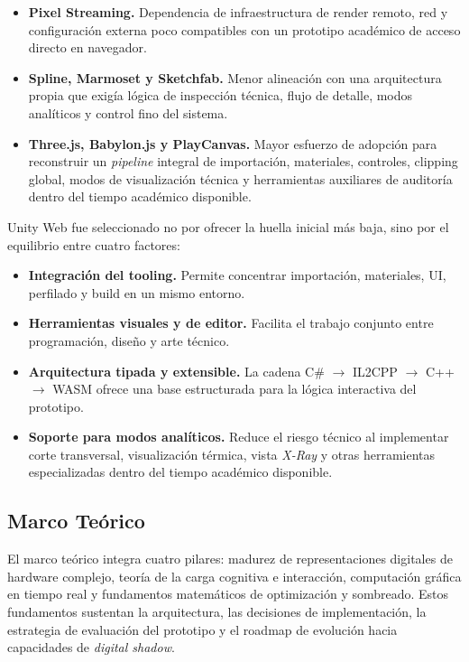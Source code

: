 \begin{itemize}
    \item \textbf{Pixel Streaming.} Dependencia de infraestructura de render remoto, red y configuración externa poco compatibles con un prototipo académico de acceso directo en navegador.
    \item \textbf{Spline, Marmoset y Sketchfab.} Menor alineación con una arquitectura propia que exigía lógica de inspección técnica, flujo de detalle, modos analíticos y control fino del sistema.
    \item \textbf{Three.js, Babylon.js y PlayCanvas.} Mayor esfuerzo de adopción para reconstruir un \textit{pipeline} integral de importación, materiales, controles, clipping global, modos de visualización técnica y herramientas auxiliares de auditoría dentro del tiempo académico disponible.
\end{itemize}

Unity Web fue seleccionado no por ofrecer la huella inicial más baja, sino por el equilibrio entre cuatro factores:
\begin{itemize}
    \item \textbf{Integración del tooling.} Permite concentrar importación, materiales, UI, perfilado y build en un mismo entorno.
    \item \textbf{Herramientas visuales y de editor.} Facilita el trabajo conjunto entre programación, diseño y arte técnico.
    \item \textbf{Arquitectura tipada y extensible.} La cadena C\# $\rightarrow$ IL2CPP $\rightarrow$ C++ $\rightarrow$ WASM ofrece una base estructurada para la lógica interactiva del prototipo.
    \item \textbf{Soporte para modos analíticos.} Reduce el riesgo técnico al implementar corte transversal, visualización térmica, vista \textit{X-Ray} y otras herramientas especializadas dentro del tiempo académico disponible.
\end{itemize}

\subsection{Marco Teórico}

El marco teórico integra cuatro pilares: madurez de representaciones digitales de hardware complejo, teoría de la carga cognitiva e interacción, computación gráfica en tiempo real y fundamentos matemáticos de optimización y sombreado. Estos fundamentos sustentan la arquitectura, las decisiones de implementación, la estrategia de evaluación del prototipo y el roadmap de evolución hacia capacidades de \textit{digital shadow}.

